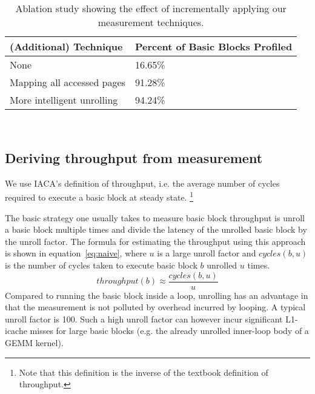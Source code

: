 \begin{table}
\begin{tabular}{
|p{}|p{}|}
\hline
\textbf{(Additional) Technique} & \textbf{Percent of Basic Blocks Profiled} \\
\hline
None & 16.65\% \\

\hline
Mapping all accessed pages & 91.28\% \\

\hline
More intelligent unrolling & 94.24\% \\

\hline
\end{tabular}
\\
\caption{Ablation study showing the effect of incrementally applying our measurement techniques.}
\label{tab:full-ablation}
\end{table}


\subsection{Deriving throughput from measurement}
We use IACA's definition of throughput, i.e. 
the average number of cycles required to execute a basic block 
at steady state.
\footnote{Note that this definition is the inverse of the textbook definition of throughput.}

The basic strategy one usually takes to measure basic block throughput
is unroll a basic block multiple times and divide the latency of the
unrolled basic block by the unroll factor.
The formula for estimating the throughput using this approach is shown
in equation~\ref{eq:naive}, where $u$ is a large unroll factor
and $\mathit{cycles}(b,u)$ is the number of cycles taken to execute basic block $b$
unrolled $u$ times.
\begin{equation}
\mathit{throughput}(b) \approx \frac{\mathit{cycles}(b,u)}{u}
\label{eq:naive}
\end{equation}
Compared to running the basic block inside a loop,
unrolling has an advantage in that the measurement is not polluted by
overhead incurred by looping.
A typical unroll factor is 100\cite{ithemal,uops}.
Such a high unroll factor can however incur significant
L1-icache misses for large basic blocks
(e.g. the already unrolled inner-loop body of a GEMM kernel).

